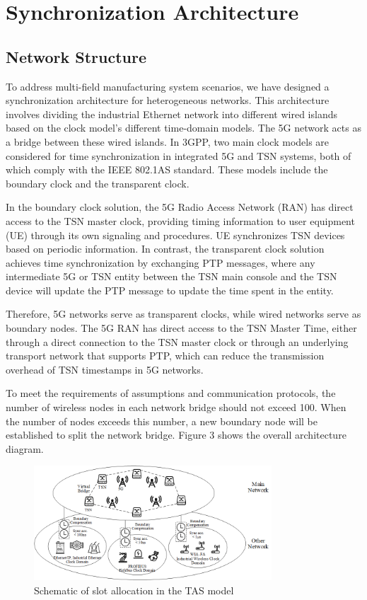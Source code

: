 \documentclass[english]{cccconf}
\begin{document}
\section{Synchronization Architecture}
\subsection{Network Structure}
To address multi-field manufacturing system scenarios, we have designed a synchronization architecture for heterogeneous networks. This architecture involves dividing the industrial Ethernet network into different wired islands based on the clock model's different time-domain models. The 5G network acts as a bridge between these wired islands. In 3GPP, two main clock models are considered for time synchronization in integrated 5G and TSN systems, both of which comply with the IEEE 802.1AS standard. These models include the boundary clock and the transparent clock\cite{9615318}.

In the boundary clock solution, the 5G Radio Access Network (RAN) has direct access to the TSN master clock, providing timing information to user equipment (UE) through its own signaling and procedures. UE synchronizes TSN devices based on periodic information. In contrast, the transparent clock solution achieves time synchronization by exchanging PTP messages, where any intermediate 5G or TSN entity between the TSN main console and the TSN device will update the PTP message to update the time spent in the entity.

Therefore, 5G networks serve as transparent clocks, while wired networks serve as boundary nodes. The 5G RAN has direct access to the TSN Master Time, either through a direct connection to the TSN master clock or through an underlying transport network that supports PTP, which can reduce the transmission overhead of TSN timestamps in 5G networks.

To meet the requirements of assumptions and communication protocols, the number of wireless nodes in each network bridge should not exceed 100. When the number of nodes exceeds this number, a new boundary node will be established to split the network bridge. Figure 3 shows the overall architecture diagram.
\begin{figure}[htbp]
	\centering
	\setcounter{figure}{3}
	\includegraphics[width=3.5in]{fig17.png}
	\caption{Schematic of slot allocation in the TAS model}
\end{figure}
\end{document}
